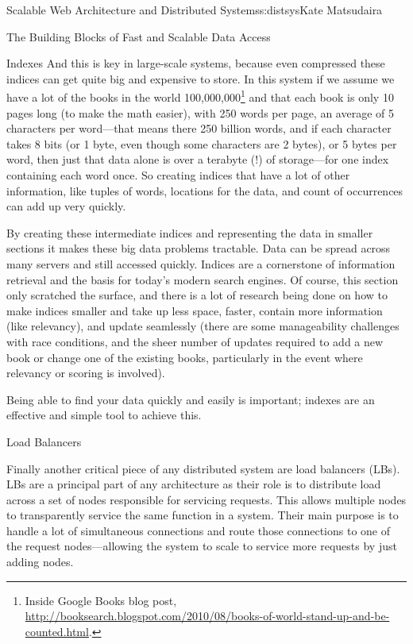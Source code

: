 \begin{aosachapter}{Scalable Web Architecture and Distributed Systems}{s:distsys}{Kate Matsudaira}
\begin{aosasect1}{The Building Blocks of Fast and Scalable Data Access}
\begin{aosasect2}{Indexes}
And this is key in large-scale systems, because even compressed these
indices can get quite big and expensive to store. In this system if we
assume we have a lot of the books in the world
100,000,000\footnote{Inside Google Books blog post,
  \url{http://booksearch.blogspot.com/2010/08/books-of-world-stand-up-and-be-counted.html}.}
and that each book is only 10 pages long (to make the math easier),
with 250 words per page, an average of 5 characters per word---that
means there 250 billion words, and if each character takes 8 bits (or
1 byte, even though some characters are 2 bytes), or 5 bytes per word,
then just that data alone is over a terabyte (!) of storage---for one
index containing each word once. So creating indices that have a lot
of other information, like tuples of words, locations for the data,
and count of occurrences can add up very quickly.

By creating these intermediate indices and representing the data in
smaller sections it makes these big data problems tractable. Data can
be spread across many servers and still accessed quickly. Indices are
a cornerstone of information retrieval and the basis for today's
modern search engines. Of course, this section only scratched the
surface, and there is a lot of research being done on how to make
indices smaller and take up less space, faster, contain more
information (like relevancy), and update seamlessly (there are some
manageability challenges with race conditions, and the sheer number of
updates required to add a new book or change one of the existing
books, particularly in the event where relevancy or scoring is
involved).

Being able to find your data quickly and easily is important; indexes
are an effective and simple tool to achieve this.

\end{aosasect2}

\begin{aosasect2}{Load Balancers}

Finally another critical piece of any distributed system are load
balancers (LBs). LBs are a principal part of any architecture as their
role is to distribute load across a set of nodes responsible for
servicing requests. This allows multiple nodes to transparently
service the same function in a system. Their main purpose is to handle
a lot of simultaneous connections and route those connections to one
of the request nodes---allowing the system to scale to service more
requests by just adding nodes.


\end{aosasect2}
\end{aosasect1}
\end{aosachapter}
